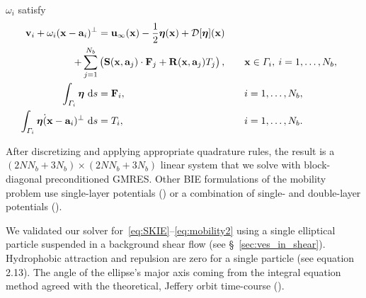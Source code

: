 \documentclass[lineno]{jfm}
\renewcommand{\aa}{\mathbf{a}}
\newcommand{\DD}{\mathcal{D}}
\newcommand{\eeta}{\boldsymbol{\eta}}
\newcommand{\FF}{\mathbf{F}}
\newcommand{\RR}{\mathbf{R}}
\renewcommand{\SS}{\mathbf{S}}
\newcommand{\xx}{\mathbf{x}}
\newcommand{\uu}{\mathbf{u}}
\renewcommand{\vv}{\mathbf{v}}
\begin{document}
$\omega_i$ satisfy
\begin{alignat}{3}
  \nonumber
  \vv_i + \omega_i (\xx - \aa_i)^\perp &= \uu_\infty(\xx)
    -\frac{1}{2} \eeta(\xx) + \DD[\eeta](\xx) \\
  \label{eq:SKIE}
    + \sum_{j=1}^{N_b} &
    \left(\SS(\xx,\aa_j) \cdot \FF_j + \RR(\xx,\aa_j) T_j\right),
    \quad &&\xx \in \Gamma_i,\: i=1,\ldots,N_b, \\
  \label{eq:mobility1}
  \int_{\Gamma_i} \eeta \, \dif s &= \mathbf{F}_i, 
  &&i = 1,\ldots,N_b, \\
  \label{eq:mobility2}
  \int_{\Gamma_i} \eeta \dot (\xx-\aa_i)^\perp \, \dif s &= T_i,
  &&i = 1,\ldots,N_b.
\end{alignat}

After discretizing and applying appropriate quadrature rules, the result
is a $(2NN_b + 3N_b) \times (2NN_b + 3N_b)$ linear system that we solve
with block-diagonal preconditioned GMRES. Other BIE formulations of the
mobility problem use single-layer potentials (\cite{cor-gre-rac-vee2017,
rac-gre2016}) or a combination of single- and double-layer potentials
(\cite{cor-vee2018}).

We validated our solver for~\eqref{eq:SKIE}--\eqref{eq:mobility2}
using a single elliptical particle suspended in a background shear flow
(see \S~\ref{sec:ves_in_shear}). Hydrophobic attraction and repulsion
are zero for a single particle (see \cite{Fu20} equation 2.13). The
angle of the ellipse's major axis coming from the integral equation
method agreed with the theoretical, Jeffery orbit time-course
(\cite{jef1922}). 
  
% 

\end{document}
